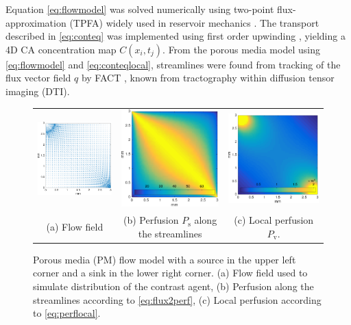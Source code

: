 \documentclass[journal,twocolumn]{IEEEtran}
\newcommand{\Perfv}{P_{\mathrm{v}}}
\newcommand{\Perfs}{P_{\mathrm{s}}}
\begin{document}
	Equation \eqref{eq:flowmodel} was solved numerically using two-point flux-approximation (TPFA) widely used in reservoir mechanics \cite{Aarnes2007}.
	The transport described in \eqref{eq:conteq} was implemented using first order upwinding \cite{Patankar80}, yielding a 4D CA concentration map $C(x_i,t_j)$.
	From the porous media model using \eqref{eq:flowmodel} and \eqref{eq:conteqlocal}, streamlines were found from tracking of the flux vector field $q$ by FACT \cite{Mori1998}, known from  tractography within diffusion tensor imaging (DTI). 
	
\begin{figure}[h!tb]
	\centering
	\begin{tabular}{c c c}
		\includegraphics[width=.3\textwidth]{figs/qmat.pdf} & \includegraphics[width=.3\textwidth]{figs/perfmat.pdf} & \includegraphics[width=.3\textwidth]{figs/lperfmat.pdf}\\
		(a) Flow field & (b) Perfusion $\Perfs$ along the streamlines  & (c) Local perfusion $\Perfv$.
	\end{tabular}
	\caption{Porous media (PM) flow model with a source in the upper left corner and a sink in the lower right corner. (a) Flow field used to simulate distribution of the contrast agent, (b) Perfusion along the streamlines according to \eqref{eq:flux2perf}, (c) Local perfusion according to \eqref{eq:perflocal}.}
        \label{fig:flowpressureperfusion}
\end{figure}
\end{document}

